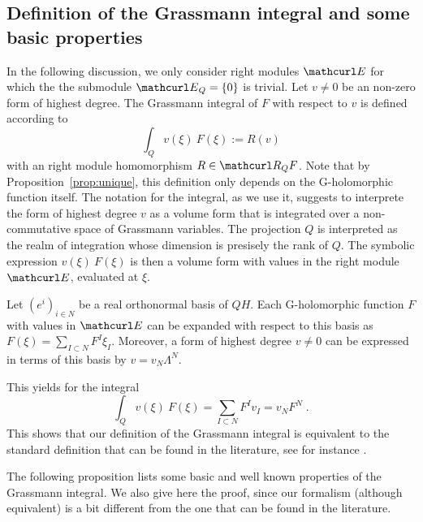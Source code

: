\documentclass[pra,twoside,amsmath,amsfonts,amssymb,superscriptaddress,showpacs]{revtex4}
\def\9#1{{\mathcurl #1}}
\begin{document}
\subsection{Definition of the Grassmann integral and some basic properties}
In the following discussion, we only consider right modules $\9E$ for which the the submodule
$\9E_Q=\{0\}$ is trivial. Let $v\not=0$ be an non-zero form of highest degree. The Grassmann
integral of $F$ with respect to
$v$ is defined according to  
\begin{equation}
\int_Q v(\xi) \ F(\xi):= R(v)
\end{equation}
with an right module homomorphism $R\in \9R_QF$. Note that by Proposition~\ref{prop:unique}, this
definition only depends on the G-holomorphic function itself. The notation for the integral, as we
use it, suggests to interprete the form of highest degree
$v$ as a volume form that is integrated over a non-commutative
space of Grassmann variables. The projection $Q$ is interpreted as the realm of integration whose
dimension is presisely the rank of $Q$.
The symbolic expression $v(\xi) \ F(\xi)$ is then a volume form with values in
the right module $\9E$, evaluated at $\xi$. 

Let $(e^i)_{i\in N}$ be a real orthonormal basis of $QH$. Each G-holomorphic function $F$ with
values in $\9E$ can be expanded with respect to this basis as $F(\xi)=\sum_{I\subset
N}F^I \xi_I$. Moreover, a form of highest degree $v\not=0$ can be expressed in terms of
this basis by $v=v_N\Lambda^N$. 


This yields for the integral 
\begin{equation}
\int_Q v(\xi) \ F(\xi)=\sum_{I\subset N} F^Iv_I=v_{N} F^{N} \; .
\end{equation}
This shows that our definition of the
Grassmann integral is equivalent to the standard definition that can be found in the literature, see
for instance \cite{VladVol84,VladVol84b}. 

The following proposition lists some basic and well known properties of the Grassmann integral. We
also give here the proof, since our formalism (although equivalent) is a bit different from the one
that can be found in the literature. 
\end{document}
